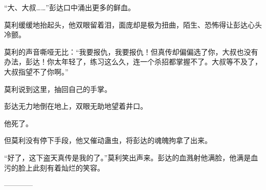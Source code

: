 \begin{this_body}
“大、大叔……”彭达口中涌出更多的鲜血。

莫利缓缓地抬起头，他双眼留着泪，面庞却是极为扭曲，陌生、恐怖得让彭达心头冷颤。

莫利的声音嘶哑无比：“我要报仇，我要报仇！但真传却偏偏选了你，大叔也没有办法，彭达！你太年轻了，练习这么久，连一个杀招都掌握不了。大叔等不及了，大叔指望不了你啊。”

莫利说到这里，抽回自己的手掌。

彭达无力地倒在地上，双眼无助地望着井口。

他死了。

但莫利没有停下手段，他又催动蛊虫，将彭达的魂魄拘拿了出来。

“好了，这下盗天真传是我的了。”莫利笑出声来。彭达的血溅射他满脸，他满是血污的脸上此刻有着灿烂的笑容。

------------

\end{this_body}

